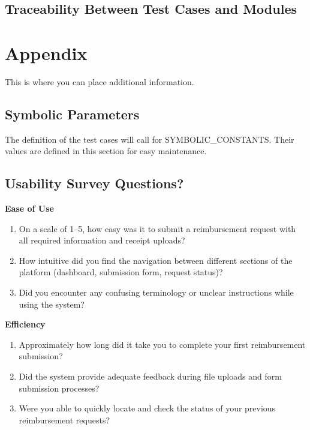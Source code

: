 \documentclass[12pt, titlepage]{article}
\begin{document}
\subsection{Traceability Between Test Cases and Modules}

				




\newpage

\section{Appendix}

This is where you can place additional information.

\subsection{Symbolic Parameters}

The definition of the test cases will call for SYMBOLIC\_CONSTANTS.
Their values are defined in this section for easy maintenance.

\subsection{Usability Survey Questions?}
  \textbf{Ease of Use}
  \begin{enumerate}
      \item On a scale of 1--5, how easy was it to submit a reimbursement request with all required information and receipt uploads?
      \item How intuitive did you find the navigation between different sections of the platform (dashboard, submission form, request status)?
      \item Did you encounter any confusing terminology or unclear instructions while using the system?
  \end{enumerate}

  \textbf{Efficiency}
  \begin{enumerate}
      \item Approximately how long did it take you to complete your first reimbursement submission?
      \item Did the system provide adequate feedback during file uploads and form submission processes?
      \item Were you able to quickly locate and check the status of your previous reimbursement requests?
  \end{enumerate}
\end{document}

